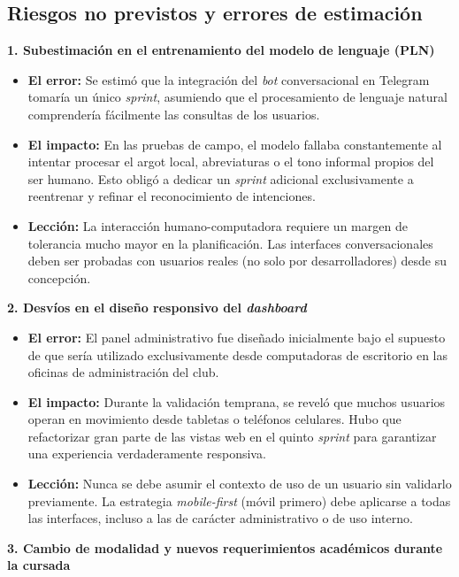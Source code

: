 \subsection{Riesgos no previstos y errores de estimación}

\textbf{1. Subestimación en el entrenamiento del modelo de lenguaje (PLN)}
\begin{itemize}
    \item \textbf{El error:} Se estimó que la integración del \textit{bot} conversacional en Telegram tomaría un único \textit{sprint}, asumiendo que el procesamiento de lenguaje natural comprendería fácilmente las consultas de los usuarios.
    \item \textbf{El impacto:} En las pruebas de campo, el modelo fallaba constantemente al intentar procesar el argot local, abreviaturas o el tono informal propios del ser humano. Esto obligó a dedicar un \textit{sprint} adicional exclusivamente a reentrenar y refinar el reconocimiento de intenciones.
    \item \textbf{Lección:} La interacción humano-computadora requiere un margen de tolerancia mucho mayor en la planificación. Las interfaces conversacionales deben ser probadas con usuarios reales (no solo por desarrolladores) desde su concepción.
\end{itemize}

\newpage

\textbf{2. Desvíos en el diseño responsivo del \textit{dashboard}}
\begin{itemize}
    \item \textbf{El error:} El panel administrativo fue diseñado inicialmente bajo el supuesto de que sería utilizado exclusivamente desde computadoras de escritorio en las oficinas de administración del club.
    \item \textbf{El impacto:} Durante la validación temprana, se reveló que muchos usuarios operan en movimiento desde tabletas o teléfonos celulares. Hubo que refactorizar gran parte de las vistas web en el quinto \textit{sprint} para garantizar una experiencia verdaderamente responsiva.
    \item \textbf{Lección:} Nunca se debe asumir el contexto de uso de un usuario sin validarlo previamente. La estrategia \textit{mobile-first} (móvil primero) debe aplicarse a todas las interfaces, incluso a las de carácter administrativo o de uso interno.
\end{itemize}

\textbf{3. Cambio de modalidad y nuevos requerimientos académicos durante la cursada}


